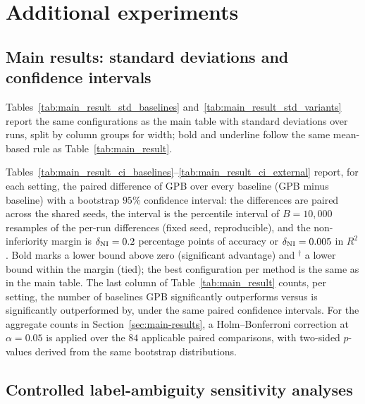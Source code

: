 \section{Additional experiments}
\label{app:experiments}

\subsection{Main results: standard deviations and confidence intervals}
\label{app:main-ci}

Tables~\ref{tab:main_result_std_baselines} and~\ref{tab:main_result_std_variants}
report the same configurations as the main table with standard deviations over
runs, split by column groups for width; bold and underline follow the same
mean-based rule as Table~\ref{tab:main_result}.



Tables~\ref{tab:main_result_ci_baselines}--\ref{tab:main_result_ci_external}
report, for each setting, the paired difference of GPB over every baseline
(GPB minus baseline) with a bootstrap $95\%$ confidence interval: the differences
are paired across the shared seeds, the interval is the percentile interval
\citep{efron1994introduction} of
$B = 10{,}000$ resamples of the per-run differences (fixed seed, reproducible), and
the non-inferiority margin is $\delta_{\rm NI} = 0.2$ percentage points of accuracy or
$\delta_{\rm NI} = 0.005$ in $R^2$. Bold marks a lower bound above zero (significant
advantage) and $^{\dagger}$ a lower bound within the margin (tied); the best
configuration per method is the same as in the main table. The last column of
Table~\ref{tab:main_result} counts, per setting, the number of baselines GPB
significantly outperforms versus is significantly outperformed by, under the same
paired confidence intervals. For the aggregate counts in
Section~\ref{sec:main-results}, a Holm--Bonferroni correction at $\alpha=0.05$
is applied over the $84$ applicable paired comparisons, with two-sided $p$-values
derived from the same bootstrap distributions.


\subsection{Controlled label-ambiguity sensitivity analyses}
\label{app:noisy-alignment-sensitivity}


